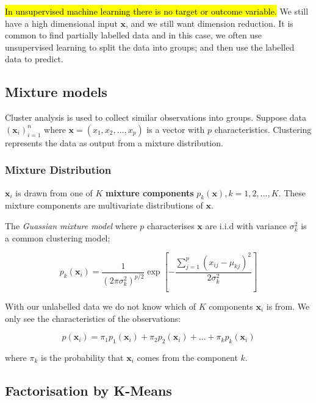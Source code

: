 \documentclass[11pt]{article}
\begin{document}
\hl{In unsupervised machine learning there is no target or outcome variable.} We still have a high dimensional input $\mathbf{x}$, and we still want dimension reduction. It is common to find partially labelled data and in this case, we often use unsupervised learning to split the data into groups; and then use the labelled data to predict.

\subsection{Mixture models}

Cluster analysis is used to collect similar observations into groups. Suppose data $(\mathbf{x}_i)_{i=1}^n$ where $\mathbf{x} = (x_1, x_2, \ldots, x_p)$ is a vector with $p$ characteristics. Clustering represents the data as output from a mixture distribution.

\subsubsection{Mixture Distribution}

$\mathbf{x}_i$ is drawn from one of $K$ \textbf{mixture components} $p_k(\mathbf{x}), k = 1, 2, \ldots, K$. These mixture components are multivariate distributions of $\mathbf{x}$. 

The \textit{Guassian mixture model} where $p$ characterises $\mathbf{x}$ are i.i.d with variance $\sigma_k^2$ is a common clustering model;

\begin{equation}
    p_k(\mathbf{x}_i) = \dfrac{1}{(2\pi\sigma_k^2)^{p/2}}\exp\left[-\dfrac{\sum_{j=1}^p (x_{ij}-\mu_{kj})^2}{2\sigma_k^2}\right]
\end{equation}

With our unlabelled data we do not know which of $K$ components $\mathbf{x}_i$ is from. We only see the characteristics of the observations:

\begin{equation*}
    p(\mathbf{x}_i) = \pi_1 p_1(\mathbf{x}_i) + \pi_2 p_2 (\mathbf{x}_i) + \ldots + \pi_k p_k (\mathbf{x}_i)
\end{equation*}

where $\pi_k$ is the probability that $\mathbf{x}_i$ comes from the component $k$.

\subsection{Factorisation by K-Means}
\end{document}
